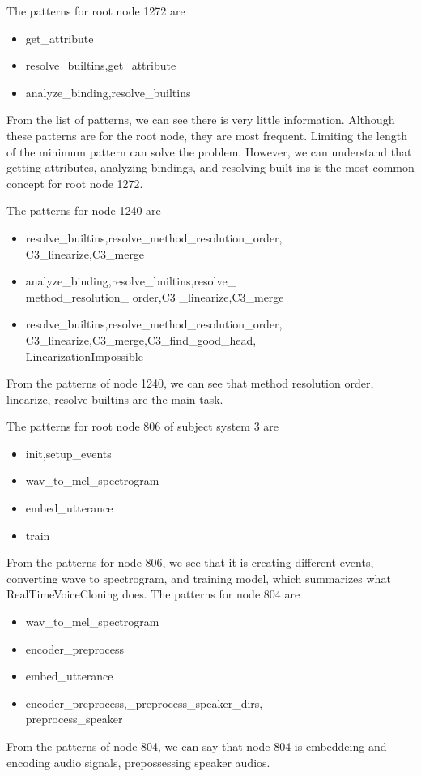The patterns for root node 1272 are

\begin{itemize}
    \item get\_attribute
    \item resolve\_builtins,get\_attribute
    \item analyze\_binding,resolve\_builtins
\end{itemize}

From the list of patterns, we can see there is very little information. Although these patterns are for the root node, they are most frequent. Limiting the length of the minimum pattern can solve the problem. However, we can understand that getting attributes, analyzing bindings, and resolving built-ins is the most common concept for root node 1272.

The patterns for node 1240 are 
\begin{itemize}
    \item resolve\_builtins,resolve\_method\_resolution\_order,\\
    C3\_linearize,C3\_merge
    \item analyze\_binding,resolve\_builtins,resolve\_\\method\_resolution\_
    order,C3
    \_linearize,C3\_merge
    \item resolve\_builtins,resolve\_method\_resolution\_order,\\
    C3\_linearize,C3\_merge,C3\_find\_good\_head,\\LinearizationImpossible
\end{itemize}
From the patterns of node 1240, we can see that method resolution order, linearize, resolve builtins are the main task.

The patterns for root node 806 of subject system 3 are

\begin{itemize}
    \item init,setup\_events
    \item wav\_to\_mel\_spectrogram
    \item embed\_utterance
    \item train
\end{itemize}

From the patterns for node 806, we see that it is creating different events, converting wave to spectrogram, and training model, which summarizes what Real\-Time\-Voice\-Cloning does. 
The patterns for node 804 are

\begin{itemize}
    \item wav\_to\_mel\_spectrogram
    \item encoder\_preprocess
    \item embed\_utterance
    \item encoder\_preprocess,\_preprocess\_speaker\_dirs,\\
    preprocess\_speaker
\end{itemize}
From the patterns of node 804, we can say that node 804 is embeddeing and encoding audio signals, prepossessing speaker audios.

